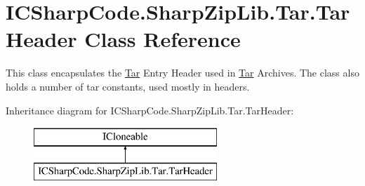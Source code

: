 \hypertarget{class_i_c_sharp_code_1_1_sharp_zip_lib_1_1_tar_1_1_tar_header}{}\section{I\+C\+Sharp\+Code.\+Sharp\+Zip\+Lib.\+Tar.\+Tar\+Header Class Reference}
\label{class_i_c_sharp_code_1_1_sharp_zip_lib_1_1_tar_1_1_tar_header}


This class encapsulates the \hyperlink{namespace_i_c_sharp_code_1_1_sharp_zip_lib_1_1_tar}{Tar} Entry Header used in \hyperlink{namespace_i_c_sharp_code_1_1_sharp_zip_lib_1_1_tar}{Tar} Archives. The class also holds a number of tar constants, used mostly in headers.  


Inheritance diagram for I\+C\+Sharp\+Code.\+Sharp\+Zip\+Lib.\+Tar.\+Tar\+Header\+:\begin{figure}[H]
\begin{center}
\leavevmode
\includegraphics[height=2.000000cm]{class_i_c_sharp_code_1_1_sharp_zip_lib_1_1_tar_1_1_tar_header}
\end{center}
\end{figure}
